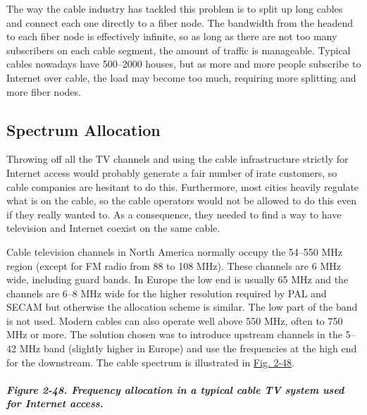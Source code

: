 The way the cable industry has tackled this problem is to split up long
cables and connect each one directly to a fiber node. The bandwidth from
the headend to each fiber node is effectively infinite, so as long as
there are not too many subscribers on each cable segment, the amount of
traffic is manageable. Typical cables nowadays have 500--2000 houses,
but as more and more people subscribe to Internet over cable, the load
may become too much, requiring more splitting and more fiber nodes.

\protect\hypertarget{0130661023_ch02lev1sec7.htmlux5cux23ch02lev2sec27}{}{}

\subsection{Spectrum Allocation}

Throwing off all the TV channels and using the cable infrastructure
strictly for Internet access would probably generate a fair number of
irate customers, so cable companies are hesitant to do this.
Furthermore, most cities heavily regulate what is on the cable, so the
cable operators would not be allowed to do this even if they really
wanted to. As a consequence, they needed to find a way to have
television and Internet coexist on the same cable.

Cable television channels in North America normally occupy the 54--550
MHz region (except for FM radio from 88 to 108 MHz). These channels are
6 MHz wide, including guard bands. In Europe the low end is usually 65
MHz and the channels are 6--8 MHz wide for the higher resolution
required by PAL and SECAM but otherwise the allocation scheme is
similar. The low part of the band is not used. Modern cables can also
operate well above 550 MHz, often to 750 MHz or more. The solution
chosen was to introduce upstream channels in the 5--42 MHz band
(slightly higher in Europe) and use the frequencies at the high end for
the downstream. The cable spectrum is illustrated in
\protect\hyperlink{0130661023_ch02lev1sec7.htmlux5cux23ch02fig48}{Fig.
2-48}.

\subparagraph[Figure 2-48. Frequency allocation in a typical cable TV
system used for Internet
access.]{\texorpdfstring{\protect\hypertarget{0130661023_ch02lev1sec7.htmlux5cux23ch02fig48}{}{}Figure
2-48. Frequency allocation in a typical cable TV system used for
Internet
access.}{Figure 2-48. Frequency allocation in a typical cable TV system used for Internet access.}}


